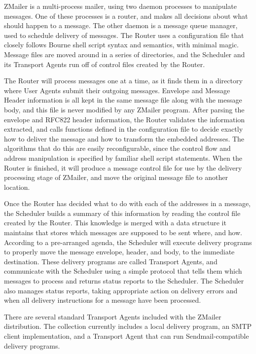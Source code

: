ZMailer is a multi-process mailer, using two daemon processes to manipulate
messages.  One of these processes is a router, and makes all decisions
about what should happen to a message.  The other daemon is a message queue
manager, used to schedule delivery of messages.  The Router uses a
configuration file that closely follows Bourne shell script syntax and
semantics, with minimal magic.  Message files are moved around in a series
of directories, and the Scheduler and its Transport Agents run off of
control files created by the Router.

The Router will process messages one at a time, as it finds them in a
directory where User Agents submit their outgoing messages.  Envelope and
Message Header information is all kept in the same message file along with
the message body, and this file is never modified by any ZMailer program.
After parsing the envelope and RFC822 header information, the Router
validates the information extracted, and calls functions defined in the
configuration file to decide exactly how to deliver the message and how to
transform the embedded addresses.  The algorithms that do this are easily
reconfigurable, since the control flow and address manipulation is
specified by familiar shell script statements.  When the Router is
finished, it will produce a message control file for use by the delivery
processing stage of ZMailer, and move the original message file to another
location.

Once the Router has decided what to do with each of the addresses in a
message, the Scheduler builds a summary of this information by reading the
control file created by the Router.  This knowledge is merged with a data
structure it maintains that stores which messages are supposed to be sent
where, and how.  According to a pre-arranged agenda, the Scheduler will
execute delivery programs to properly move the message envelope, header,
and body, to the immediate destination.  These delivery programs are called
Transport Agents, and communicate with the Scheduler using a simple
protocol that tells them which messages to process and returns status
reports to the Scheduler.  The Scheduler also manages status reports,
taking appropriate action on delivery errors and when all delivery
instructions for a message have been processed.

There are several standard Transport Agents included with the ZMailer
distribution.  The collection currently includes a local delivery program,
an SMTP client implementation, and a Transport Agent that can run
Sendmail-compatible delivery programs.

